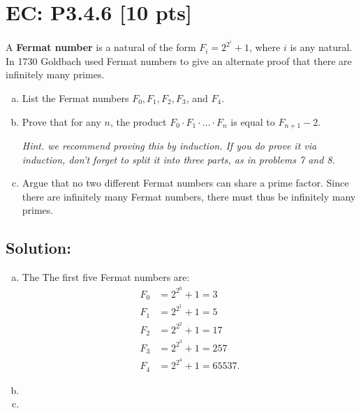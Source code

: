 \documentclass[12pt]{article}
\begin{document}
	\newpage

	\section*{\textbf{EC: P3.4.6} [10 pts]}
	A \textbf{Fermat number} is a natural of the form $F_{i} = 2^{2^i}+ 1$, where
	$i$ is any natural. In 1730 Goldbach used Fermat numbers to give an alternate proof
	that there are infinitely many primes.
	\begin{enumerate}[(a)]
		\item List the Fermat numbers $F_{0}, F_{1}, F_{2}, F_{3}$, and $F_{4}$.

		\item Prove that for any $n$, the product
			$F_{0} \cdot F_{1} \cdot \ldots \cdot F_{n}$ is equal to $F_{n+1}- 2$.

			{\em Hint. we recommend proving this by induction. If you do prove it via induction, don't forget to split it into three parts, as in problems 7 and 8.}

		\item Argue that no two different Fermat numbers can share a prime factor.
			Since there are infinitely many Fermat numbers, there must thus be infinitely
			many primes.
	\end{enumerate}

	\subsection*{\textbf{Solution:}}
	\begin{enumerate}[(a)]
		\item The The first five Fermat numbers are:
			\[
				\begin{aligned}
					F_{0} & = 2^{2^0}+1=3      \\
					F_{1} & = 2^{2^1}+1=5      \\
					F_{2} & = 2^{2^2}+1=17     \\
					F_{3} & = 2^{2^3}+1=257    \\
					F_{4} & = 2^{2^4}+1=65537.
				\end{aligned}
			\]

		\item

		\item
	\end{enumerate}
\end{document}
